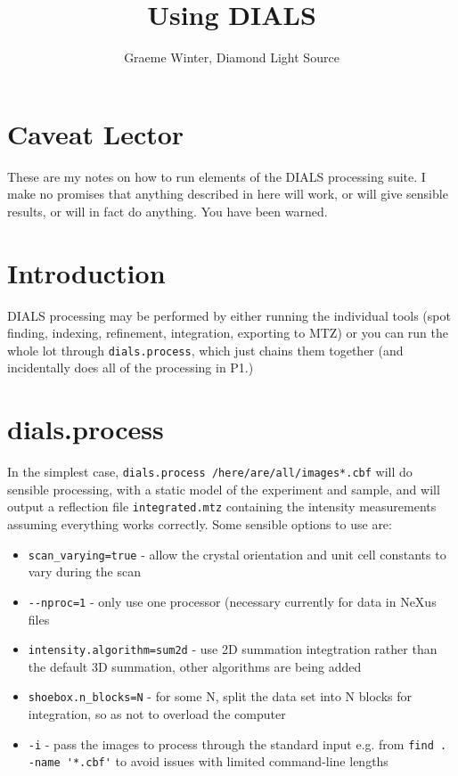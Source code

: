 \documentclass[a4paper, 11pt]{article}
\title{Using DIALS}
\author{Graeme Winter, Diamond Light Source}
\begin{document}
\maketitle

\section{Caveat Lector}

These are my notes on how to run elements of the DIALS processing suite. I make no promises that anything described in here will work, or will give sensible results, or will in fact do anything. You have been warned.

\section{Introduction}

DIALS processing may be performed by either running the individual tools (spot finding, indexing, refinement, integration, exporting to MTZ) or you can run the whole lot through \verb|dials.process|, which just chains them together (and incidentally does all of the processing in P1.)

\section{dials.process}

In the simplest case, \verb|dials.process /here/are/all/images*.cbf| will do  sensible processing, with a static model of the experiment and sample, and will output a reflection file \verb|integrated.mtz| containing the intensity measurements assuming everything works correctly. Some sensible options to use are:

\begin{itemize}
\item{\verb|scan_varying=true| - allow the crystal orientation and unit cell constants to vary during the scan}
\item{\verb|--nproc=1| - only use one processor (necessary currently for data in NeXus files}
\item{\verb|intensity.algorithm=sum2d| - use 2D summation integtration rather than the default 3D summation, other algorithms are being added}
\item{\verb|shoebox.n_blocks=N| - for some N, split the data set into N blocks for integration, so as not to overload the computer}
\item{\verb|-i| - pass the images to process through the standard input e.g. from \verb|find . -name '*.cbf'| to avoid issues with limited command-line lengths}
\end{itemize}
\end{document}
